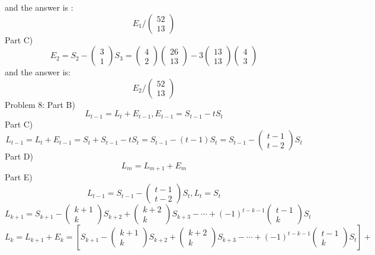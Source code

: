 \documentclass{article}
\begin{document}
and the answer is :
$$
E_1
/
\left(\begin{array}{c}
52\\
13
\end{array}\right)
$$
Part C)
$$
E_2=S_2
-
\left(\begin{array}{c}
3\\
1
\end{array}\right)
S_3
=
\left(\begin{array}{c}
4\\
2
\end{array}\right)
\left(\begin{array}{c}
26\\
13
\end{array}\right)
-
3
\left(\begin{array}{c}
13\\
13
\end{array}\right)
\left(\begin{array}{c}
4\\
3
\end{array}\right)
$$
and the answer is:
$$
E_2/
\left(\begin{array}{c}
52\\
13
\end{array}\right)
$$
Problem 8: Part B)
$$
L_{t-1} = L_t + E_{t-1} , E_{t-1} = S_{t-1} - tS_t
$$
Part C)
$$
L_{t-1} = L_t + E_{t-1} = S_t + S_{t-1} - tS_t = S_{t-1} - (t-1)S_t = S_{t-1}
-
\left(\begin{array}{c}
t-1\\
t-2
\end{array}\right)
S_t
$$
Part D)
$$
L_m = L_{m+1} + E_m
$$
Part E)
$$
L_{t-1} = S_{t-1} -
\left(\begin{array}{c}
t-1\\
t-2
\end{array}\right)
S_t
,
L_t = S_t
$$
$$
L_{k+1}=S_{k+1}
-
\left(\begin{array}{c}
k+1\\
k
\end{array}\right)
S_{k+2}
+
\left(\begin{array}{c}
k+2\\
k
\end{array}\right)
S_{k+3}
-
\cdots
+
(-1)^{t-k-1}
\left(\begin{array}{c}
t-1\\
k
\end{array}\right)
S_t
$$
$$
L_k=L_{k+1}+E_k=\left[
S_{k+1}
-
\left(\begin{array}{c}
k+1\\
k
\end{array}\right)
S_{k+2}
+
\left(\begin{array}{c}
k+2\\
k
\end{array}\right)
S_{k+3}
-
\cdots
+
(-1)^{t-k-1}
\left(\begin{array}{c}
t-1\\
k
\end{array}\right)
S_t
\right]
+
$$
\end{document}
